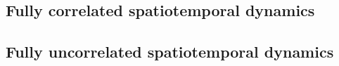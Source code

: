 \subsection{Fully correlated spatiotemporal dynamics}

%

\subsection{Fully uncorrelated spatiotemporal dynamics}

%
%
